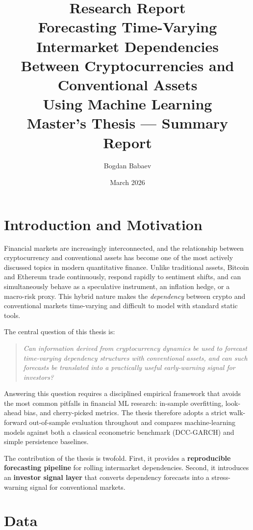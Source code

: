 \documentclass[12pt, a4paper]{article}
\title{%
  \large\textbf{Research Report}\\[6pt]
  \Large Forecasting Time-Varying Intermarket Dependencies\\
  Between Cryptocurrencies and Conventional Assets\\
  Using Machine Learning\\[10pt]
  \normalsize Master's Thesis — Summary Report
}
\author{Bogdan Babaev}
\date{March 2026}
\begin{document}
\maketitle
\tableofcontents
\newpage

\section{Introduction and Motivation}

Financial markets are increasingly interconnected, and the relationship
between cryptocurrency and conventional assets has become one of the most
actively discussed topics in modern quantitative finance.
Unlike traditional assets, Bitcoin and Ethereum trade continuously,
respond rapidly to sentiment shifts, and can simultaneously behave as
a speculative instrument, an inflation hedge, or a macro-risk proxy.
This hybrid nature makes the \emph{dependency} between crypto and
conventional markets time-varying and difficult to model with standard
static tools.

The central question of this thesis is:
\begin{quote}
\textit{Can information derived from cryptocurrency dynamics be used to
forecast time-varying dependency structures with conventional assets,
and can such forecasts be translated into a practically useful
early-warning signal for investors?}
\end{quote}

Answering this question requires a disciplined empirical framework that
avoids the most common pitfalls in financial ML research: in-sample
overfitting, look-ahead bias, and cherry-picked metrics.
The thesis therefore adopts a strict walk-forward out-of-sample
evaluation throughout and compares machine-learning models against
both a classical econometric benchmark (DCC-GARCH) and simple
persistence baselines.

The contribution of the thesis is twofold. First, it provides a
\textbf{reproducible forecasting pipeline} for rolling intermarket
dependencies. Second, it introduces an \textbf{investor signal layer}
that converts dependency forecasts into a stress-warning signal for
conventional markets.

\section{Data}
\end{document}
